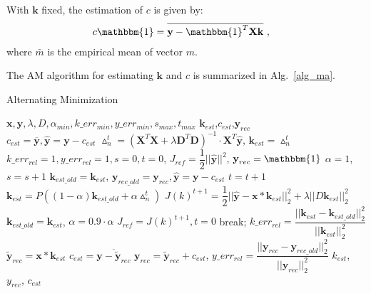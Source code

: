 \documentclass[]{elsarticle} %
\begin{document}
With $\textbf{k}$ fixed, the estimation of $c$ is given by:
\begin{equation}\label{8}
\begin{aligned}
&c\mathbbm{1} =\overline{\textbf{y} - \mathbbm{1}^{T}\textbf{X} \textbf{k}}\ ,
\end{aligned}
\end{equation}
where $\bar{m}$ is the empirical mean of vector $m$.

The AM algorithm for estimating $\textbf{k}$ and $c$ is summarized in Alg.~\ref{alg_ma}.

\begin{algorithm}[H]
    \caption{Alternating Minimization}
    \label{alg_ma}
    \begin{algorithmic}[1]
        \renewcommand{\algorithmicrequire}{\textbf{Input:}}
        \renewcommand{\algorithmicensure}{\textbf{Output:}}
        \REQUIRE $\textbf{x},\textbf{y}, \lambda, D, \alpha_{min}, k\_err_{min}, y\_err_{min}, s_{max}, t_{max}$
        \ENSURE  $\textbf{k}_{est}$,$c_{est}$,$\textbf{y}_{rec}$\\
        \STATE  $c_{est} = \overline{\textbf{y}}, \hat{\textbf{y}} = \textbf{y} - c_{est}$
        \STATE $\vartriangle_{n}^{t} = (\textbf{X}^{T}\textbf{X} + \lambda \textbf{D}^{T}\textbf{D})^{-1} \cdot \textbf{X}^{T}\hat{\textbf{y}}$,   $\textbf{k}_{est} = \vartriangle_{n}^{t}$
        \STATE $k\_err_{rel} = 1, y\_err_{rel} = 1, s = 0, t = 0$,  $J_{ref} = \dfrac{1}{2} ||\hat{\textbf{y}}||^{2}$, $\textbf{y}_{rec} = \mathbbm{1}$
        \STATE $\alpha = 1$, $s = s + 1$
        \STATE $\textbf{k}_{est\_old} = \textbf{k}_{est}$, $\textbf{y}_{rec\_old} = \textbf{y}_{rec}, \hat{\textbf{y}} = \textbf{y} - c_{est}$
        \STATE $t = t + 1$
        \STATE $\textbf{k}_{est} = P \left((1-\alpha)\textbf{k}_{est\_old} + \alpha  \vartriangle_{n}^{t}\right)$
        \STATE $J(k)^{t+1} = \dfrac{1}{2} ||\hat{\textbf{y}} - \textbf{x} \ast \textbf{k}_{est}||_{2}^{2} + \lambda ||D \textbf{k}_{est}||_{2}^{2} $
        \STATE $\textbf{k}_{est\_old} = \textbf{k}_{est}$, $\alpha = 0.9 \cdot \alpha$
        \ELSE
        \STATE $J_{ref} = J(k)^{t+1}, t = 0$
        \STATE break;
        \ENDIF
        \STATE $k\_err_{rel} = \dfrac{||\textbf{k}_{est} - \textbf{k}_{est\_old}||_{2}^{2}}{||\textbf{k}_{est}||_{2}^{2}}$
        \ENDWHILE
        \STATE $\tilde{\textbf{y}}_{rec} = \textbf{x} \ast \textbf{k}_{est}$
        \STATE $c_{est} = \overline{\textbf{y} -  \tilde{\textbf{y}}_{rec}}$
        \STATE $\textbf{y}_{rec} =  \tilde{\textbf{y}}_{rec} + c_{est}$, $y\_err_{rel} = \dfrac{||\textbf{y}_{rec} - \textbf{y}_{rec\_old}||_{2}^{2}}{||\textbf{y}_{rec}||_{2}^{2}}$
        \ENDWHILE
        \RETURN $k_{est}$, $y_{rec}$, $c_{est}$
    \end{algorithmic}
\end{algorithm}
\end{document}
